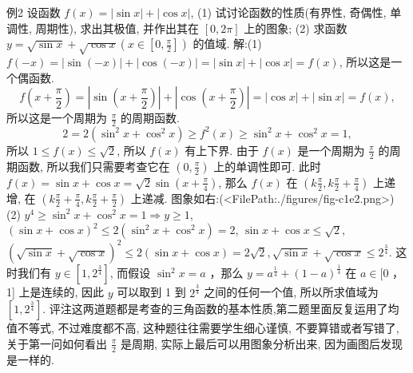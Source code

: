 例2 设函数 $f(x)=|\sin x|+|\cos x|$, 
(1) 试讨论函数的性质(有界性, 奇偶性, 单调性, 周期性), 求出其极值, 并作出其在 $[0,2 \pi]$ 上的图象;
(2) 求函数 $y=\sqrt{\sin x}+\sqrt{\cos x}\left(x \in\left[0, \frac{\pi}{2}\right]\right)$ 的值域.
解:(1) $f(-x)=|\sin (-x)|+|\cos (-x)|=|\sin x|+|\cos x|=f(x)$, 所以这是一个偶函数.
$$
f\left(x+\frac{\pi}{2}\right)=\left|\sin \left(x+\frac{\pi}{2}\right)\right|+\left|\cos \left(x+\frac{\pi}{2}\right)\right|=|\cos x|+|\sin x|=f(x),
$$
所以这是一个周期为 $\frac{\pi}{2}$ 的周期函数.
$$
2=2\left(\sin ^2 x+\cos ^2 x\right) \geqslant f^2(x) \geqslant \sin ^2 x+\cos ^2 x=1,
$$
所以 $1 \leqslant f(x) \leqslant \sqrt{2}$, 所以 $f(x)$ 有上下界.
由于 $f(x)$ 是一个周期为 $\frac{\pi}{2}$ 的周期函数, 所以我们只需要考查它在 $\left(0, \frac{\pi}{2}\right)$ 上的单调性即可.
此时 $f(x)=\sin x+\cos x=\sqrt{2} \sin \left(x+\frac{\pi}{4}\right)$, 那么 $f(x)$ 在 $\left(k \frac{\pi}{2}, k \frac{\pi}{2}+\right. \left.\frac{\pi}{4}\right)$ 上递增, 在 $\left(k \frac{\pi}{2}+\frac{\pi}{4}, k \frac{\pi}{2}+\frac{\pi}{2}\right)$ 上递减.
图象如右:(<FilePath:./figures/fig-c1e2.png>)
(2) $y^4 \geqslant \sin ^2 x+\cos ^2 x=1 \Rightarrow y \geqslant 1$,
$(\sin x+\cos x)^2 \leqslant 2\left(\sin ^2 x+\cos ^2 x\right)=2$, $\sin x+\cos x \leqslant \sqrt{2}$,
$(\sqrt{\sin x}+\sqrt{\cos x})^2 \leqslant 2(\sin x+\cos x)= 2 \sqrt{2}, \sqrt{\sin x}+\sqrt{\cos x} \leqslant 2^{\frac{3}{4}}$.
这时我们有 $y \in\left[1,2^{\frac{3}{4}}\right]$, 而假设 $\sin ^2 x=a$ ，那么 $y=a^{\frac{1}{4}}+(1-a)^{\frac{1}{4}}$ 在 $a \in[0$ ， 1] 上是连续的, 因此 $y$ 可以取到 1 到 $2^{\frac{3}{4}}$ 之间的任何一个值, 所以所求值域为 $\left[1,2^{\frac{3}{4}}\right]$.
评注这两道题都是考查的三角函数的基本性质,第二题里面反复运用了均值不等式, 不过难度都不高, 这种题往往需要学生细心谨慎, 不要算错或者写错了, 关于第一问如何看出 $\frac{\pi}{2}$ 是周期, 实际上最后可以用图象分析出来, 因为画图后发现是一样的.



